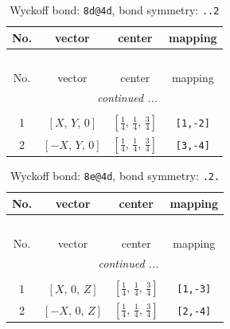 \documentclass[fleqn,8pt]{jsarticle}
\begin{document}
\renewcommand{\arraystretch}{1.2}
\begin{longtable}{cccc}
\caption{Wyckoff bond: {\tt 8d@4d}, bond symmetry: {\tt ..2}}
 \\
 \hline \hline
No. & vector & center & mapping \\ \hline \endfirsthead

\multicolumn{3}{l}{\tablename\ \thetable{}} \\
 \hline \hline
No. & vector & center & mapping \\ \hline \endhead

 \hline \hline
\multicolumn{3}{r}{\footnotesize\it continued ...} \\ \endfoot

 \hline \hline
\multicolumn{3}{r}{} \\ \endlastfoot

1 & $\left[ X,\, Y,\, 0 \right]$ & $\left[ \frac{1}{4},\, \frac{1}{4},\, \frac{3}{4} \right]$ & {\tt [1,-2]} \\ \hline
2 & $\left[ - X,\, Y,\, 0 \right]$ & $\left[ \frac{1}{4},\, \frac{1}{4},\, \frac{3}{4} \right]$ & {\tt [3,-4]} \\
\end{longtable}
\renewcommand{\arraystretch}{1.2}
\begin{longtable}{cccc}
\caption{Wyckoff bond: {\tt 8e@4d}, bond symmetry: {\tt .2.}}
 \\
 \hline \hline
No. & vector & center & mapping \\ \hline \endfirsthead

\multicolumn{3}{l}{\tablename\ \thetable{}} \\
 \hline \hline
No. & vector & center & mapping \\ \hline \endhead

 \hline \hline
\multicolumn{3}{r}{\footnotesize\it continued ...} \\ \endfoot

 \hline \hline
\multicolumn{3}{r}{} \\ \endlastfoot

1 & $\left[ X,\, 0,\, Z \right]$ & $\left[ \frac{1}{4},\, \frac{1}{4},\, \frac{3}{4} \right]$ & {\tt [1,-3]} \\ \hline
2 & $\left[ - X,\, 0,\, Z \right]$ & $\left[ \frac{1}{4},\, \frac{1}{4},\, \frac{3}{4} \right]$ & {\tt [2,-4]} \\
\end{longtable}
\renewcommand{\arraystretch}{1.2}
\end{document}
